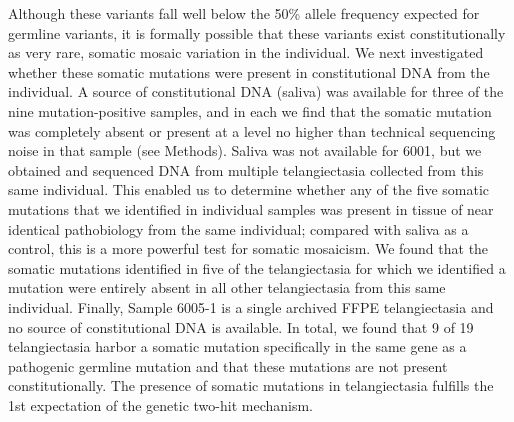 Although these variants fall well below the 50\% allele frequency expected for germline variants, it is formally possible that these variants exist constitutionally as very rare, somatic mosaic variation in the individual.  We next investigated whether these somatic mutations were present in constitutional DNA from the individual. A source of constitutional DNA (saliva) was available for three of the nine mutation-positive samples, and in each we find that the somatic mutation was completely absent or present at a level no higher than technical sequencing noise in that sample (see Methods).  Saliva was not available for 6001, but we obtained and sequenced DNA from multiple telangiectasia collected from this same individual. This enabled us to determine whether any of the five somatic mutations that we identified in individual samples was present in tissue of near identical pathobiology from the same individual; compared with saliva as a control, this is a more powerful test for somatic mosaicism. We found that the somatic mutations identified in five of the telangiectasia for which we identified a mutation were entirely absent in all other telangiectasia from this same individual. Finally, Sample 6005-1 is a single archived FFPE telangiectasia and no source of constitutional DNA is available. In total, we found that 9 of 19 telangiectasia harbor a somatic mutation specifically in the same gene as a pathogenic germline mutation and that these mutations are not present constitutionally. The presence of somatic mutations in telangiectasia fulfills the 1st expectation of the genetic two-hit mechanism. 

